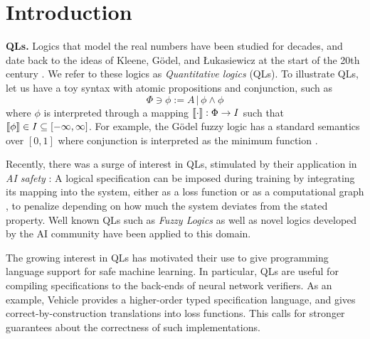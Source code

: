 \documentclass[sigplan, screen, review, nonacm]{acmart}
\begin{document}
\maketitle

\section{Introduction}

\textbf{QLs.} Logics that model the real numbers have been studied for decades, and date back to the ideas of Kleene, G\"{o}del, and Łukasiewicz at the start of the 20th century \cite{cintula2011handbook,prooffuzzy}. We refer to these logics as \textit{Quantitative logics} (QLs). To illustrate QLs, let us have a toy syntax with atomic propositions and conjunction, such as 
\begin{equation*}
    \Phi \ni \phi := A \,|\, \phi \land \phi
\end{equation*}
where $\phi$ is interpreted through a mapping $\llbracket \cdot \rrbracket : \Phi \rightarrow I$ such that \hbox{$\llbracket \phi \rrbracket \in I \subseteq [-\infty,\infty]$}. For example, the G\"{o}del fuzzy logic has a standard semantics over $[0, 1]$ where conjunction is interpreted as the minimum function \citep{cintula2011handbook}.

Recently, there was a surge of interest in QLs, stimulated by their application in \emph{AI safety} \cite{davidad24, dalrymple2024guaranteedsafeaiframework}: A logical specification can be imposed during training by integrating its mapping into the system, either as a loss function \citep{slusarz2023logic,van2022analyzing} or as a computational graph \cite{serafini2016logic, petersen2022deep, choi2020probabilistic}, to penalize depending on how much the system deviates from the stated property. Well known QLs such as \textit{Fuzzy Logics} \citep{cintula2011handbook} as well as novel logics developed by the AI community \citep{serafini2016logic, varnai2020robustness, fischer2019dl2} have been applied to this domain.

The growing interest in QLs has motivated their use to give programming language support for safe machine learning. In particular, QLs are useful for compiling specifications to the back-ends of neural network verifiers. As an example, Vehicle \citep{vehicle} provides a higher-order typed specification language, and gives correct-by-construction translations into loss functions. This calls for stronger guarantees about the correctness of such implementations.
\end{document}
